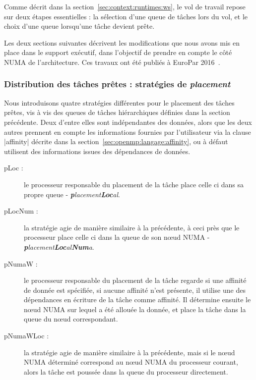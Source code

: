 Comme décrit dans la section~\ref{sec:context:runtimes:ws}, le vol de travail repose sur deux étapes essentielles : la sélection d'une queue de tâches lors du vol, et le choix d'une queue lorsqu'une tâche devient prête.

Les deux sections suivantes décrivent les modifications que nous avons mis en place dans le support exécutif, dans l'objectif de prendre en compte le côté NUMA de l'architecture.
Ces travaux ont été publiés à EuroPar 2016~\cite{Virouleau2016b}.


\subsubsection{Distribution des tâches prêtes : stratégies de \emph{placement}}
\label{sec:openmp:runtime:push}

Nous introduisons quatre stratégies différentes pour le placement des tâches prêtes, vis à vis des queues de tâches hiérarchiques définies dans la section précédente.
Deux d'entre elles sont indépendantes des données, alors que les deux autres prennent en compte les informations fournies par l'utilisateur via la clause |affinity| décrite dans la section~\ref{sec:openmp:langage:affinity}, ou à défaut utilisent des informations issues des dépendances de données.

\begin{description}
  \item [pLoc :] le processeur responsable du placement de la tâche place celle ci dans sa propre queue - \emph{\textbf{p}lacement\textbf{Loc}al}.
  \item [pLocNum :] la stratégie agie de manière similaire à la précédente, à ceci près que le processeur place celle ci dans la queue de son nœud NUMA - \emph{\textbf{p}lacement\textbf{Loc}al\textbf{Num}a}.
  \item [pNumaW :] le processeur responsable du placement de la tâche regarde si une affinité de donnée est spécifiée, si aucune affinité n'est présente, il utilise une des dépendances en écriture de la tâche comme affinité.
Il détermine ensuite le nœud NUMA sur lequel a été allouée la donnée, et place la tâche dans la queue du nœud correspondant.
  \item [pNumaWLoc :] la stratégie agie de manière similaire à la précédente, mais si le nœud NUMA déterminé correspond au nœud NUMA du processeur courant, alors la tâche est poussée dans la queue du processeur directement.
\end{description}

